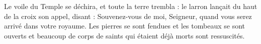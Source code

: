 Le voile du Temple se déchira,
et toute la terre trembla :
le larron lançait du haut de la croix son appel, disant :
Souvenez-vous de moi, Seigneur,
quand vous serez arrivé dans votre royaume.
\versseparator
Les pierres se sont fendues et les tombeaux se sont ouverts
et beaucoup de corps de saints qui étaient déjà morts sont ressuscités.
